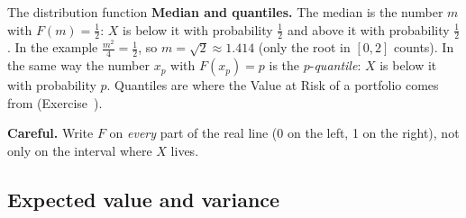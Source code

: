 \begin{key}{The distribution function}
	\textbf{Median and quantiles.} The median is the number $m$ with
	$F(m)=\frac12$: $X$ is below it with probability $\frac12$ and above it
	with probability $\frac12$. In the example $\frac{m^2}{4}=\frac12$, so
	$m=\sqrt2\approx1.414$ (only the root in $[0,2]$ counts). In the same way
	the number $x_p$ with $F(x_p)=p$ is the $p$-\emph{quantile}: $X$ is below
	it with probability $p$. Quantiles are where the Value at Risk of a
	portfolio comes from (Exercise~).

	\textbf{Careful.} Write $F$ on \emph{every} part of the real line (0 on
	the left, 1 on the right), not only on the interval where $X$ lives.
\end{key}


\subsection*{Expected value and variance}


